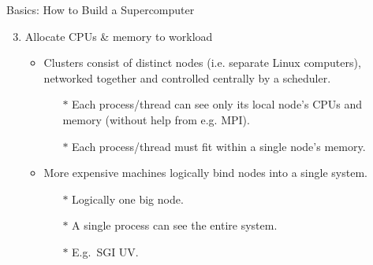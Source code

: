 
\begin{frame}{Basics: How to Build a Supercomputer}
\begin{enumerate}
\setcounter{enumi}{2}
\item{Allocate CPUs \& memory to workload}
\begin{itemize}
\item{Clusters consist of distinct nodes (i.e. separate Linux computers), networked together and controlled centrally by a \alert{scheduler}.}
  \begin{itemize}
\pause
\item[$\ast$]{\alert{Each process/thread can see only its local node's CPUs and memory (without help from e.g. MPI).}}
\pause
\item[$\ast$]{\color{red}Each process/thread must fit within a single node's memory.}
\end{itemize}
\pause
\item{More expensive machines logically bind nodes into a single system.}
\begin{itemize}
\item[$\ast$]{Logically one big node.}
\item[$\ast$]{A single process can see the entire system.}
\item[$\ast$]{E.g.\ SGI UV.}
\end{itemize}
\end{itemize}
\end{enumerate}
\end{frame}

